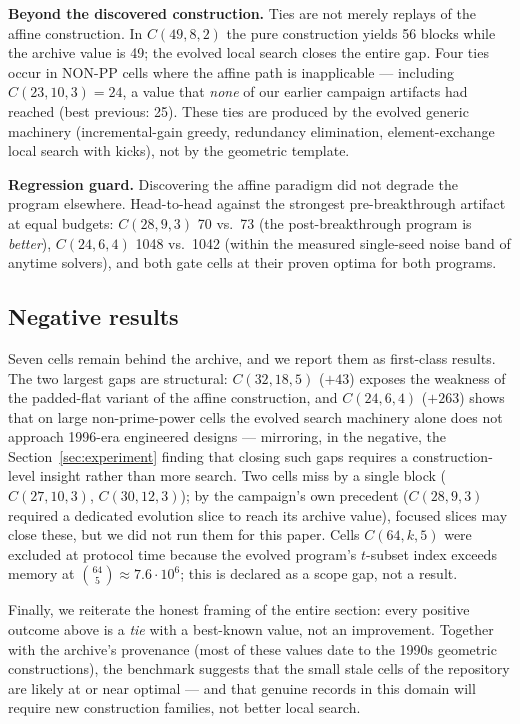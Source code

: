\textbf{Beyond the discovered construction.} Ties are not merely
replays of the affine construction. In $C(49,8,2)$ the pure
construction yields 56 blocks while the archive value is 49; the
evolved local search closes the entire gap. Four ties occur in
NON-PP cells where the affine path is inapplicable --- including
$C(23,10,3)=24$, a value that \emph{none} of our earlier campaign
artifacts had reached (best previous: 25). These ties are produced
by the evolved generic machinery (incremental-gain greedy, redundancy
elimination, element-exchange local search with kicks), not by the
geometric template.

\textbf{Regression guard.} Discovering the affine paradigm did not
degrade the program elsewhere. Head-to-head against the strongest
pre-breakthrough artifact at equal budgets: $C(28,9,3)$ 70 vs.\ 73
(the post-breakthrough program is \emph{better}), $C(24,6,4)$ 1048
vs.\ 1042 (within the measured single-seed noise band of anytime
solvers), and both gate cells at their proven optima for both
programs.

\subsection{Negative results}

Seven cells remain behind the archive, and we report them as
first-class results. The two largest gaps are structural:
$C(32,18,5)$ ($+43$) exposes the weakness of the padded-flat variant
of the affine construction, and $C(24,6,4)$ ($+263$) shows that on
large non-prime-power cells the evolved search machinery alone does
not approach 1996-era engineered designs --- mirroring, in the
negative, the Section~\ref{sec:experiment} finding that closing such
gaps requires a construction-level insight rather than more search.
Two cells miss by a single block ($C(27,10,3)$, $C(30,12,3)$); by the
campaign's own precedent ($C(28,9,3)$ required a dedicated evolution
slice to reach its archive value), focused slices may close these,
but we did not run them for this paper. Cells $C(64,k,5)$ were
excluded at protocol time because the evolved program's $t$-subset
index exceeds memory at $\binom{64}{5} \approx 7.6\cdot10^6$; this is
declared as a scope gap, not a result.

Finally, we reiterate the honest framing of the entire section: every
positive outcome above is a \emph{tie} with a best-known value, not
an improvement. Together with the archive's provenance (most of
these values date to the 1990s geometric constructions), the
benchmark suggests that the small stale cells of the repository are
likely at or near optimal --- and that genuine records in this domain
will require new construction families, not better local search.
